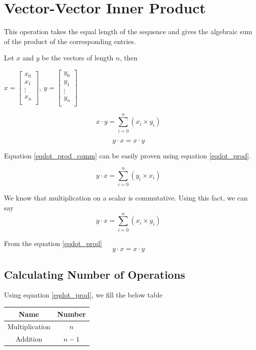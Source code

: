\chapter{Vector-Vector Inner Product}

This operation takes the equal length of the 
sequence and gives the algebraic sum of the product of the corresponding entries.

Let $x$ and $y$ be the vectors of length $n$, then

$x = 
\begin{bmatrix}
    x_0 \\    
    x_1 \\    
    \vdots \\
    x_n \\    
\end{bmatrix}
,\ y = 
\begin{bmatrix}
    y_0 \\    
    y_1 \\    
    \vdots \\
    y_n \\    
\end{bmatrix}
$

\begin{equation}
    x \cdot y = \sum_{i=0}^{n}(x_i \times y_i)
    \label{eqdot_prod}
\end{equation}

\begin{equation}
    y \cdot x = x \cdot y
    \label{eqdot_prod_comm}
\end{equation}

Equation \ref{eqdot_prod_comm} can be easily proven using equation \ref{eqdot_prod}.

\[y \cdot x = \sum_{i=0}^{n}(y_i \times x_i)\]

We know that multiplication on a scalar is commutative. Using this fact, we can say
\[y \cdot x = \sum_{i=0}^{n}(x_i \times y_i)\]

From the equation \ref{eqdot_prod}
\[y \cdot x = x \cdot y\]

\section{Calculating Number of Operations}

Using equation \ref{eqdot_prod}, we fill the below table

\begin{tabular}{|c|c|}
    \hline
    \textbf{Name} & \textbf{Number} \\
    \hline
    Multiplication & $n$ \\
    \hline
    Addition & $n - 1$ \\
    \hline
\end{tabular}

